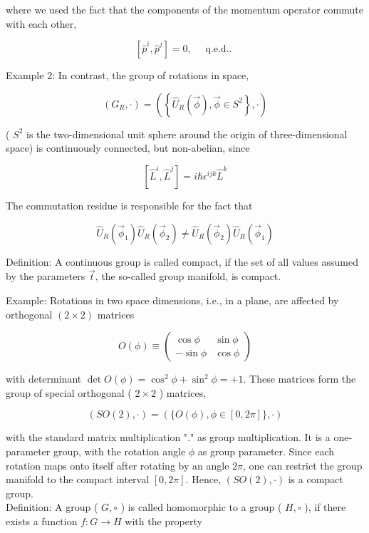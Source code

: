\documentclass[10pt, letterpaper]{article}
\begin{document}
where we used the fact that the components of the momentum operator commute with each other,

$$
\left[\hat{p}^{i}, \hat{p}^{j}\right]=0, \quad \text { q.e.d.. }
$$

Example 2: In contrast, the group of rotations in space,

$$
\left(G_{R}, \cdot\right)=\left(\left\{\hat{U}_{R}(\vec{\phi}), \vec{\phi} \in S^{2}\right\}, \cdot\right)
$$

( $S^{2}$ is the two-dimensional unit sphere around the origin of three-dimensional space) is continuously connected, but non-abelian, since

$$
\left[\hat{L}^{i}, \hat{L}^{j}\right]=i \hbar \epsilon^{i j k} \hat{L}^{k}
$$

The commutation residue is responsible for the fact that

$$
\hat{U}_{R}\left(\vec{\phi}_{1}\right) \hat{U}_{R}\left(\vec{\phi}_{2}\right) \neq \hat{U}_{R}\left(\vec{\phi}_{2}\right) \hat{U}_{R}\left(\vec{\phi}_{1}\right)
$$

Definition: A continuous group is called compact, if the set of all values assumed by the parameters $\vec{t}$, the so-called group manifold, is compact.

Example: Rotations in two space dimensions, i.e., in a plane, are affected by orthogonal $(2 \times 2)$ matrices

$$
O(\phi) \equiv\left(\begin{array}{cc}
\cos \phi & \sin \phi \\
-\sin \phi & \cos \phi
\end{array}\right)
$$

with determinant $\operatorname{det} O(\phi)=\cos ^{2} \phi+\sin ^{2} \phi=+1$. These matrices form the group of special orthogonal ( $2 \times 2$ ) matrices,

$$
(S O(2), \cdot)=(\{O(\phi), \phi \in[0,2 \pi]\}, \cdot)
$$

with the standard matrix multiplication "." as group multiplication. It is a one-parameter group, with the rotation angle $\phi$ as group parameter. Since each rotation maps onto itself after rotating by an angle $2 \pi$, one can restrict the group manifold to the compact interval $[0,2 \pi]$. Hence, $(S O(2), \cdot)$ is a compact group.\\
Definition: A group ( $G, \circ$ ) is called homomorphic to a group ( $H, \square$ ), if there exists a function $f: G \rightarrow H$ with the property
\end{document}
